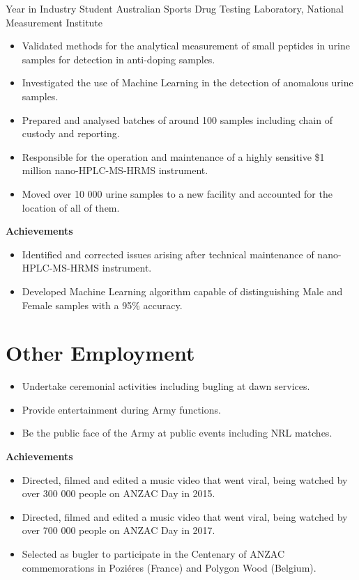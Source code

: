 {Year in Industry Student}
{Australian Sports Drug Testing Laboratory, National Measurement Institute}
{}{}
{%
  \begin{itemize}
    \item Validated methods for the analytical measurement of small peptides in urine samples
      for detection in anti-doping samples.
    \item Investigated the use of Machine Learning in the detection of anomalous urine samples.
    \item Prepared and analysed batches of around 100 samples including chain of custody and reporting.
    \item Responsible for the operation and maintenance of a highly sensitive \$1 million nano-HPLC-MS-HRMS instrument.
    \item Moved over 10 000 urine samples to a new facility and accounted for the location of all of them.
  \end{itemize}
  \textbf{Achievements}
  \begin{itemize}
    \item Identified and corrected issues arising after technical maintenance of nano-HPLC-MS-HRMS instrument.
    \item Developed Machine Learning algorithm capable of distinguishing Male and Female samples with a 95\% accuracy.
  \end{itemize}
}


\pagebreak
\section{Other Employment}

{}{}
{%
  \begin{itemize}
    \item Undertake ceremonial activities including bugling at dawn services.
    \item Provide entertainment during Army functions.
    \item Be the public face of the Army at public events including NRL matches.
  \end{itemize}
  \textbf{Achievements}
  \begin{itemize}
    \item Directed, filmed and edited a music video  that went viral, being watched by over 300 000 people on ANZAC Day in 2015.
    \item Directed, filmed and edited a music video  that went viral, being watched by over 700 000 people on ANZAC Day in 2017.
    \item Selected as bugler to participate in the Centenary of ANZAC commemorations in Poziéres (France) and Polygon Wood (Belgium).
  \end{itemize}
}


